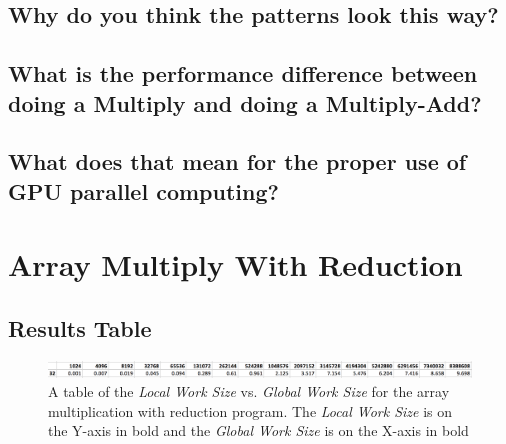 \documentclass[onecolumn,draftclsnofoot, 10pt, compsoc]{IEEEtran}
\begin{document}
	
	
	
	
	
	
	
	
	\subsection{Why do you think the patterns look this way?}










	\subsection{What is the performance difference between doing a Multiply and doing a Multiply-Add?}
	
	





	
	
	
	\subsection{What does that mean for the proper use of GPU parallel computing?}









\section{Array Multiply With Reduction}
	\subsection{Results Table}
		\begin{figure}[H]
			\includegraphics[width=18cm]{redTable}
			\centering
			\caption{A table of the \textit{Local Work Size} vs. \textit{Global Work Size} for the array multiplication with reduction program.
				The \textit{Local Work Size} is on the Y-axis in bold and the \textit{Global Work Size} is on the X-axis in bold}
		\end{figure}
	
	
	
	
	
\end{document}
